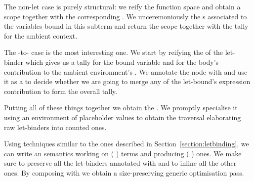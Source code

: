 The non-let case is purely structural: we reify the  function
space and obtain a scope together with the corresponding . We
unceremoniously  the s associated to the variables
bound in this subterm and return the scope together with the tally for
the ambient context.

\begin{agdasnippet}
\end{agdasnippet}

The -to- case is the most
interesting one. We start by reifying the  of the let-binder which
gives us a tally  for the bound variable and  for the body's
contribution to the ambient environment's . We annotate the node
with  and use it as a  to decide whether we are going to
merge any of the let-bound's expression contribution  to form the
overall tally.

\begin{agdasnippet}
\end{agdasnippet}

Putting all of these things together we obtain the  .
We promptly specialise it using an environment of placeholder values to obtain
the traversal  elaborating raw let-binders into counted ones.

\begin{agdasnippet}
\end{agdasnippet}

Using techniques similar to the ones described in Section~\ref{section:letbinding},
we can write an  semantics working on {(  )} terms
and producing {(  )} ones. We make sure to preserve all the
let-binders annotated with  and to inline all the other ones. By composing
 with  we obtain a size-preserving generic optimisation pass.
